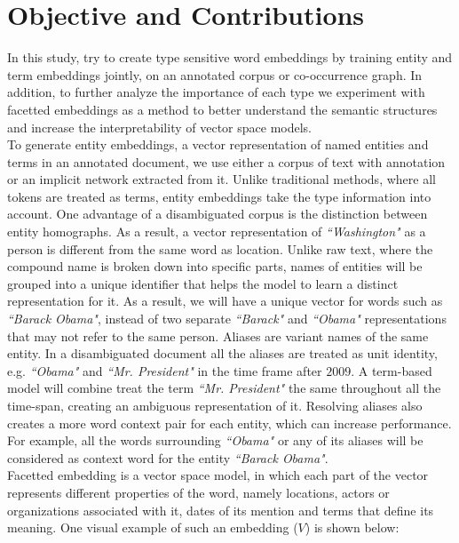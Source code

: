 \section{Objective and Contributions}
In this study, try to create type sensitive word embeddings by training entity and term embeddings jointly,  on an annotated corpus or co-occurrence graph. In addition, to further analyze the importance of each type we experiment with facetted embeddings as a method to better understand the semantic structures and increase the interpretability of vector space models. \\
To generate entity embeddings, a vector representation of named entities and terms in an annotated document, we use either a corpus of text with annotation or an implicit network extracted from it. Unlike traditional methods, where all tokens are treated as terms, entity embeddings take the type information into account. One advantage of a disambiguated corpus is the distinction between entity homographs. As a result, a vector representation of \emph{``Washington"} as a person is different from the same word as location. Unlike raw text, where the compound name is broken down into specific parts, names of entities will be grouped into a unique identifier that helps the model to learn a distinct representation for it. As a result, we will have a unique vector for words such as  \emph{``Barack Obama"}, instead of two separate \emph{``Barack"} and \emph{``Obama"} representations that may not refer to the same person. Aliases are variant names of the same entity. In a disambiguated document all the aliases are treated as unit identity, e.g. \emph{``Obama"} and \emph{``Mr. President"} in the time frame after $2009$. A term-based model will combine treat the term \emph{``Mr. President"} the same throughout all the time-span, creating an ambiguous representation of it. Resolving aliases also creates a more word context pair for each entity, which can increase performance. For example, all the words surrounding \emph{``Obama"} or any of its aliases will be considered as context word for the entity \emph{``Barack Obama"}. \\
\noindent
Facetted embedding is a vector space model, in which each part of the vector represents different properties of the word, namely locations, actors or organizations associated with it, dates of its mention and terms that define its meaning. One visual example of such an embedding ($V$) is shown below: \\
\mathleft
